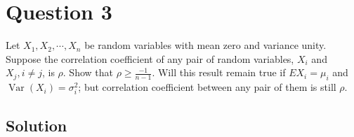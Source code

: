 \section*{Question 3}

Let \( X_{1}, X_{2}, \cdots, X_{n} \) be random variables with mean zero and variance unity.
Suppose the correlation coefficient of any pair of random variables, \( X_{i} \) and \( X_{j}, i \neq j \), is \( \rho \).
Show that \( \rho \geq \frac{-1}{n-1} \).
Will this result remain true if \( E X_{i}=\mu_{i} \) and \( \operatorname{Var}\left(X_{i}\right)=\sigma_{i}^{2} \); but correlation coefficient between any pair of them is still \( \rho \).

\subsection*{Solution}
